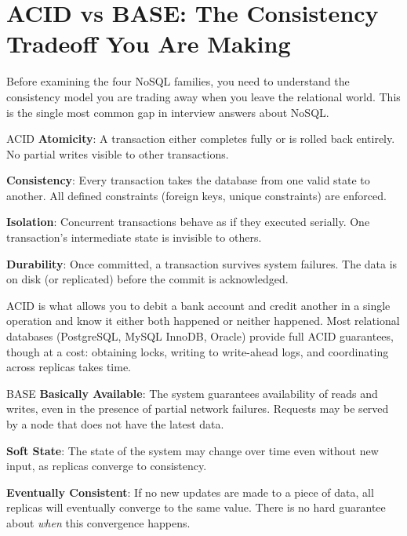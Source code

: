 \documentclass[11pt,a4paper]{article}
\begin{document}
\section{ACID vs BASE: The Consistency Tradeoff You Are Making}

Before examining the four NoSQL families, you need to understand the consistency model you are trading away when you leave the relational world. This is the single most common gap in interview answers about NoSQL.

\begin{termbox}{ACID}
\textbf{Atomicity}: A transaction either completes fully or is rolled back entirely. No partial writes visible to other transactions.

\textbf{Consistency}: Every transaction takes the database from one valid state to another. All defined constraints (foreign keys, unique constraints) are enforced.

\textbf{Isolation}: Concurrent transactions behave as if they executed serially. One transaction's intermediate state is invisible to others.

\textbf{Durability}: Once committed, a transaction survives system failures. The data is on disk (or replicated) before the commit is acknowledged.
\end{termbox}

ACID is what allows you to debit a bank account and credit another in a single operation and know it either both happened or neither happened. Most relational databases (PostgreSQL, MySQL InnoDB, Oracle) provide full ACID guarantees, though at a cost: obtaining locks, writing to write-ahead logs, and coordinating across replicas takes time.

\begin{termbox}{BASE}
\textbf{Basically Available}: The system guarantees availability of reads and writes, even in the presence of partial network failures. Requests may be served by a node that does not have the latest data.

\textbf{Soft State}: The state of the system may change over time even without new input, as replicas converge to consistency.

\textbf{Eventually Consistent}: If no new updates are made to a piece of data, all replicas will eventually converge to the same value. There is no hard guarantee about \textit{when} this convergence happens.
\end{termbox}
\end{document}
